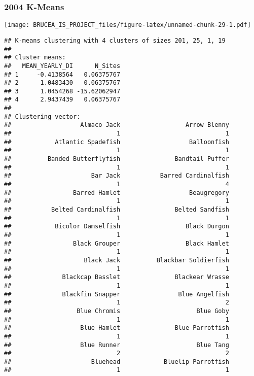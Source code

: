 \documentclass[
]{article}
\begin{document}
\hypertarget{k-means-3}{%
\subsubsection{2004 K-Means}\label{k-means-3}}

\texttt{[image: BRUCEA\_IS\_PROJECT\_files/figure-latex/unnamed-chunk-29-1.pdf]}

\begin{verbatim}
## K-means clustering with 4 clusters of sizes 201, 25, 1, 19
## 
## Cluster means:
##   MEAN_YEARLY_DI      N_Sites
## 1     -0.4138564   0.06375767
## 2      1.0483430   0.06375767
## 3      1.0454268 -15.62062947
## 4      2.9437439   0.06375767
## 
## Clustering vector:
##                   Almaco Jack                  Arrow Blenny 
##                             1                             1 
##            Atlantic Spadefish                   Balloonfish 
##                             1                             1 
##          Banded Butterflyfish               Bandtail Puffer 
##                             1                             1 
##                      Bar Jack           Barred Cardinalfish 
##                             1                             4 
##                 Barred Hamlet                   Beaugregory 
##                             1                             1 
##           Belted Cardinalfish               Belted Sandfish 
##                             1                             1 
##            Bicolor Damselfish                  Black Durgon 
##                             1                             1 
##                 Black Grouper                  Black Hamlet 
##                             1                             1 
##                    Black Jack          Blackbar Soldierfish 
##                             1                             1 
##              Blackcap Basslet               Blackear Wrasse 
##                             1                             1 
##              Blackfin Snapper                Blue Angelfish 
##                             1                             2 
##                  Blue Chromis                     Blue Goby 
##                             1                             1 
##                   Blue Hamlet               Blue Parrotfish 
##                             1                             1 
##                   Blue Runner                     Blue Tang 
##                             2                             2 
##                      Bluehead            Bluelip Parrotfish 
##                             1                             1 

\end{verbatim}
\end{document}

